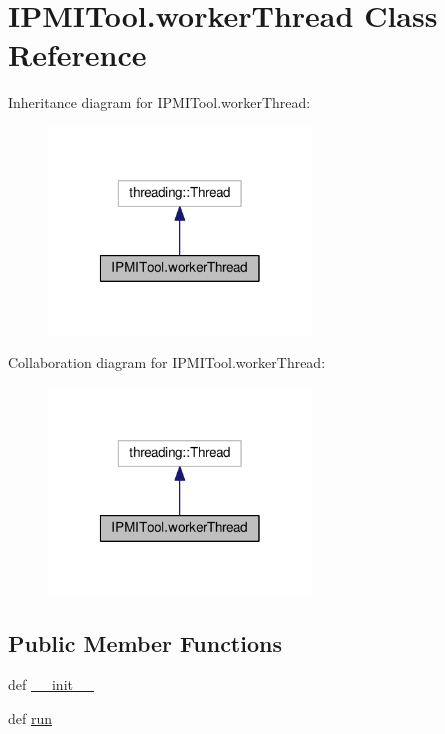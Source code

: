 \hypertarget{class_i_p_m_i_tool_1_1worker_thread}{\section{I\-P\-M\-I\-Tool.\-worker\-Thread Class Reference}
\label{class_i_p_m_i_tool_1_1worker_thread}
}


Inheritance diagram for I\-P\-M\-I\-Tool.\-worker\-Thread\-:
\nopagebreak
\begin{figure}[H]
\begin{center}
\leavevmode
\includegraphics[width=198pt]{class_i_p_m_i_tool_1_1worker_thread__inherit__graph}
\end{center}
\end{figure}


Collaboration diagram for I\-P\-M\-I\-Tool.\-worker\-Thread\-:
\nopagebreak
\begin{figure}[H]
\begin{center}
\leavevmode
\includegraphics[width=198pt]{class_i_p_m_i_tool_1_1worker_thread__coll__graph}
\end{center}
\end{figure}
\subsection*{Public Member Functions}
\begin{DoxyCompactItemize}
\item 
def \hyperlink{class_i_p_m_i_tool_1_1worker_thread_ae99fbfedf34b12d752aff36969fdb346}{\-\_\-\-\_\-init\-\_\-\-\_\-}
\item 
def \hyperlink{class_i_p_m_i_tool_1_1worker_thread_a8584ed7e68afe66df337c3619ad4d1a4}{run}
\end{DoxyCompactItemize}
